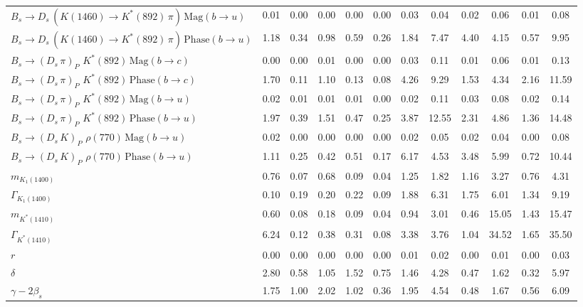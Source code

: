 \begin{tabular}{l  c  c  c  c  c  c  c  c  c  c  | c }
$B_s \to D_s \, ( K(1460) \to K^{*}(892) \, \pi ) \, \text{Mag} (b \to u)$ & 0.01 & 0.00 & 0.00 & 0.00 & 0.00 & 0.03 & 0.04 & 0.02 & 0.06 & 0.01 & 0.08 \\ 
$B_s \to D_s \, ( K(1460) \to K^{*}(892) \, \pi ) \, \text{Phase} (b \to u)$ & 1.18 & 0.34 & 0.98 & 0.59 & 0.26 & 1.84 & 7.47 & 4.40 & 4.15 & 0.57 & 9.95 \\ 
$B_s \to ( D_s \, \pi)_{P} \, \, K^{*}(892) \, \text{Mag} (b \to c)$ & 0.00 & 0.00 & 0.01 & 0.00 & 0.00 & 0.03 & 0.11 & 0.01 & 0.06 & 0.01 & 0.13 \\ 
$B_s \to ( D_s \, \pi)_{P} \, \, K^{*}(892) \, \text{Phase} (b \to c)$ & 1.70 & 0.11 & 1.10 & 0.13 & 0.08 & 4.26 & 9.29 & 1.53 & 4.34 & 2.16 & 11.59 \\ 
$B_s \to ( D_s \, \pi)_{P} \, \, K^{*}(892) \, \text{Mag} (b \to u)$ & 0.02 & 0.01 & 0.01 & 0.01 & 0.00 & 0.02 & 0.11 & 0.03 & 0.08 & 0.02 & 0.14 \\ 
$B_s \to ( D_s \, \pi)_{P} \, \, K^{*}(892) \, \text{Phase} (b \to u)$ & 1.97 & 0.39 & 1.51 & 0.47 & 0.25 & 3.87 & 12.55 & 2.31 & 4.86 & 1.36 & 14.48 \\ 
$B_s \to ( D_s \, K)_{P} \, \, \rho(770) \, \text{Mag} (b \to u)$ & 0.02 & 0.00 & 0.00 & 0.00 & 0.00 & 0.02 & 0.05 & 0.02 & 0.04 & 0.00 & 0.08 \\ 
$B_s \to ( D_s \, K)_{P} \, \, \rho(770) \, \text{Phase} (b \to u)$ & 1.11 & 0.25 & 0.42 & 0.51 & 0.17 & 6.17 & 4.53 & 3.48 & 5.99 & 0.72 & 10.44 \\ 
$m_{K_1(1400)} $ & 0.76 & 0.07 & 0.68 & 0.09 & 0.04 & 1.25 & 1.82 & 1.16 & 3.27 & 0.76 & 4.31 \\ 
$\Gamma_{K_1(1400)}$ & 0.10 & 0.19 & 0.20 & 0.22 & 0.09 & 1.88 & 6.31 & 1.75 & 6.01 & 1.34 & 9.19 \\ 
$m_{K^{*}(1410)}$ & 0.60 & 0.08 & 0.18 & 0.09 & 0.04 & 0.94 & 3.01 & 0.46 & 15.05 & 1.43 & 15.47 \\ 
$\Gamma_{K^{*}(1410)}$ & 6.24 & 0.12 & 0.38 & 0.31 & 0.08 & 3.38 & 3.76 & 1.04 & 34.52 & 1.65 & 35.50 \\ 
$r$ & 0.00 & 0.00 & 0.00 & 0.00 & 0.00 & 0.01 & 0.02 & 0.00 & 0.01 & 0.00 & 0.03 \\ 
$\delta$ & 2.80 & 0.58 & 1.05 & 1.52 & 0.75 & 1.46 & 4.28 & 0.47 & 1.62 & 0.32 & 5.97 \\ 
$\gamma - 2 \beta_{s}$ & 1.75 & 1.00 & 2.02 & 1.02 & 0.36 & 1.95 & 4.54 & 0.48 & 1.67 & 0.56 & 6.09 \\ 
\hline
\hline
\end{tabular}
